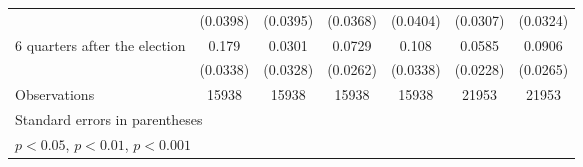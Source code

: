 \begin{table}[htbp]
\begin{tabular}{l*{6}{c}}
                    &    (0.0398)         &    (0.0395)         &    (0.0368)         &    (0.0404)         &    (0.0307)         &    (0.0324)         \\
[1em]
 6 quarters after the election&       0.179\sym{***}&      0.0301         &      0.0729\sym{**} &       0.108\sym{**} &      0.0585\sym{*}  &      0.0906\sym{***}\\
                    &    (0.0338)         &    (0.0328)         &    (0.0262)         &    (0.0338)         &    (0.0228)         &    (0.0265)         \\
\hline
Observations        &       15938         &       15938         &       15938         &       15938         &       21953         &       21953         \\
\hline\hline
\multicolumn{7}{l}{\footnotesize Standard errors in parentheses}\\
\multicolumn{7}{l}{\footnotesize \sym{*} \(p<0.05\), \sym{**} \(p<0.01\), \sym{***} \(p<0.001\)}\\
\end{tabular}
\end{table}
